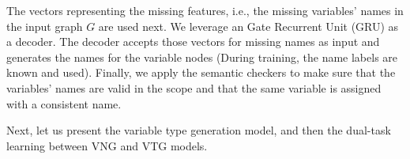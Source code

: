 The vectors representing the missing features, i.e., the missing
variables' names in the input graph $G$ are used next.  We leverage an
Gate Recurrent Unit (GRU) as a decoder.
The decoder accepts those vectors for missing names as input and
generates the names for the variable nodes (During training, the name
labels are known and used). Finally, we apply the semantic checkers to
make sure that the variables' names are valid in the scope and that
the same variable is assigned with a consistent name.



Next, let us present the variable type generation model, and then
the dual-task learning between VNG and VTG models.









